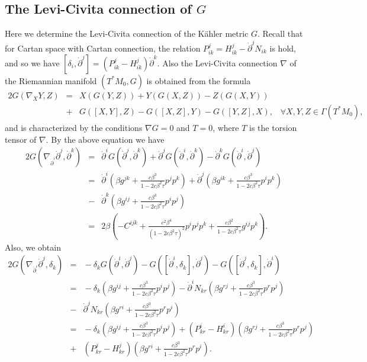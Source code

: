 \documentclass[10pt,a4paper]{article}
\theoremstyle{plain}
\theoremstyle{definition}
\begin{document}
\subsection{The Levi-Civita connection of $G$}
Here we determine the Levi-Civita connection of the K\"{a}hler metric $G$.
Recall that for Cartan space with Cartan connection, the relation
$P^j_{ik}=H^j_{ik}-{\dot{\partial}}^jN_{ik}$ is hold, and so we
have
$[\delta_i,{\dot{\partial}}^j]=(P^j_{ik}-H^j_{ik}){\dot{\partial}}^k$.
Also the Levi-Civita connection $\nabla$ of the Riemannian
manifold $(T^{\ast}M_0,G)$ is obtained from the formula
\begin{eqnarray}
2G({\nabla }_{X} Y,Z)\!\!\!\!&=&\!\!\!\!X(G(Y,Z))+Y(G(X,Z))-Z(G(X,Y))\nonumber\\
\!\!\!\!&+&\!\!\!\!G([X,Y],Z)-G([X,Z],Y)-G([Y,Z],X),\, \, \, \, \,
\forall X,Y,Z\in \Gamma(T^{\ast}M_0),\label{Levi}
\end{eqnarray}
and is characterized by the conditions $\nabla G=0$ and $T=0$, where
$T$ is the torsion tensor of $\nabla$. By the above equation we have
\begin{eqnarray}
2G(\nabla_{{\dot{\partial}}^i}{\dot{\partial}}^j,{\dot{\partial}}^k)
\!\!\!\!&=&\!\!\!\!{\dot{\partial}}^iG({\dot{\partial}}^j,{\dot{\partial}}^k)
+{\dot{\partial}}^jG({\dot{\partial}}^i,{\dot{\partial}}^k)-{\dot{\partial}}^kG({\dot{\partial}}^i,{\dot{\partial}}^j)\nonumber\\
\!\!\!\!&=&\!\!\!\!{\dot{\partial}}^i(\beta
g^{jk}+\frac{c\beta^3}{1-2c\beta^2\tau}p^jp^k)+{\dot{\partial}}^j(\beta
g^{ik}+\frac{c\beta^3}{1-2c\beta^2\tau}p^ip^k)\nonumber\\
\!\!\!\!&-&\!\!\!\!{\dot{\partial}}^k(\beta
g^{ij}+\frac{c\beta^3}{1-2c\beta^2\tau}p^ip^j)\nonumber\\
\!\!\!\!&=&\!\!\!\!
2\beta(-C^{ijk}+\frac{c^2\beta^4}{(1-2c\beta^2\tau)^2}p^ip^jp^k+\frac{c\beta^2}{1-2c\beta^2\tau}g^{ij}p^k).\label{con7}
\end{eqnarray}
Also, we obtain
\begin{eqnarray*}
2G(\nabla_{{\dot{\partial}}^i}{\dot{\partial}}^j,\delta_k)
\!\!\!\!&=&\!\!\!\!-\delta_kG({\dot{\partial}}^i,{\dot{\partial}}^j)
-G([{\dot{\partial}}^i,\delta_k],{\dot{\partial}}^j)-G([{\dot{\partial}}^j,\delta_k],{\dot{\partial}}^i)\nonumber\\
\!\!\!\!&=&\!\!\!\!-\delta_k(\beta
g^{ij}+\frac{c\beta^3}{1-2c\beta^2\tau}p^ip^j)-{\dot{\partial}}^iN_{kr}(\beta
g^{rj}+\frac{c\beta^3}{1-2c\beta^2\tau}p^rp^j)\\
\!\!\!\!&-&\!\!\!\!{\dot{\partial}}^jN_{kr}(\beta
g^{ri}+\frac{c\beta^3}{1-2c\beta^2\tau}p^rp^i)\nonumber\\
\!\!\!\!&=&\!\!\!\!-\delta_k(\beta
g^{ij}+\frac{c\beta^3}{1-2c\beta^2\tau}p^ip^j)+(P^i_{kr}-H^i_{kr})(\beta
g^{rj}+\frac{c\beta^3}{1-2c\beta^2\tau}p^rp^j)\\
\!\!\!\!&+&\!\!\!\!(P^j_{kr}-H^j_{kr})(\beta
g^{ri}+\frac{c\beta^3}{1-2c\beta^2\tau}p^rp^i).
\end{eqnarray*}
\end{document}
